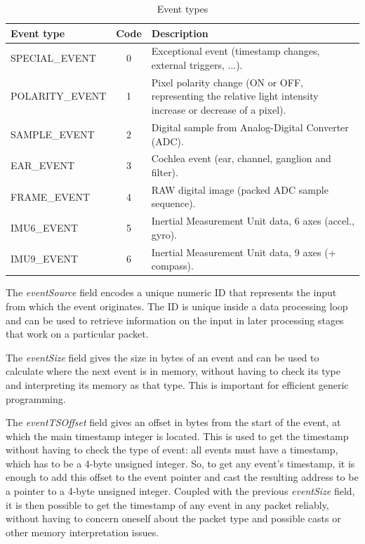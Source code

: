 \documentclass[a4paper,12pt]{report}
\begin{document}
\begin{table}[H]
\begin{center}
\caption{Event types}
\label{tab:event_types}
\begin{tabu} to \linewidth {|l|c|X|}
\hline
Event type & Code & Description \\ \hline
SPECIAL\_EVENT & 0 & Exceptional event (timestamp changes, external triggers, ...). \\ \hline
POLARITY\_EVENT & 1 & Pixel polarity change (ON or OFF, representing the relative light intensity increase or decrease of a pixel). \\ \hline
SAMPLE\_EVENT & 2 & Digital sample from Analog-Digital Converter (ADC). \\ \hline
EAR\_EVENT & 3 & Cochlea event (ear, channel, ganglion and filter). \\ \hline
FRAME\_EVENT & 4 & RAW digital image (packed ADC sample sequence). \\ \hline
IMU6\_EVENT & 5 & Inertial Measurement Unit data, 6 axes (accel., gyro). \\ \hline
IMU9\_EVENT & 6 & Inertial Measurement Unit data, 9 axes (+ compass). \\ \hline
\end{tabu}
\end{center}
\end{table}

The \emph{eventSource} field encodes a unique numeric ID that represents the input from which the event originates.
The ID is unique inside a data processing loop and can be used to retrieve information on the input in later processing stages that work on a particular packet.

The \emph{eventSize} field gives the size in bytes of an event and can be used to calculate where the next event is in memory, without having to check its type and interpreting its memory as that type. This is important for efficient generic programming.

The \emph{eventTSOffset} field gives an offset in bytes from the start of the event, at which the main timestamp integer is located. This is used to get the timestamp without having to check the type of event: all events must have a timestamp, which has to be a 4-byte unsigned integer. So, to get any event's timestamp, it is enough to add this offset to the event pointer and cast the resulting address to be a pointer to a 4-byte unsigned integer. Coupled with the previous \emph{eventSize} field, it is then possible to get the timestamp of any event in any packet reliably, without having to concern oneself about the packet type and possible casts or other memory interpretation issues.
\end{document}
